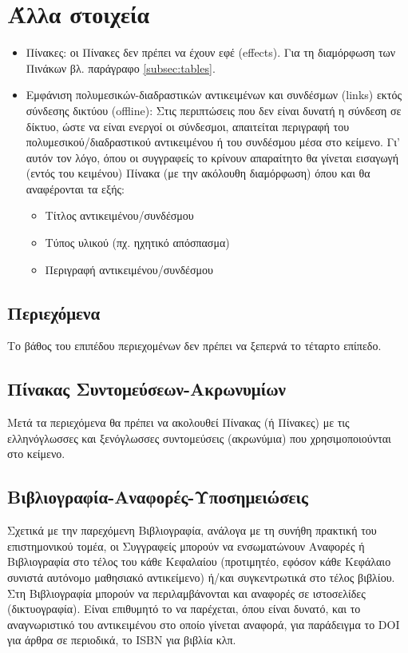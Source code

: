 \section{Άλλα στοιχεία}

\begin{itemize}
\item Πίνακες: οι Πίνακες δεν πρέπει να έχουν εφέ (effects). Για τη διαμόρφωση των Πινάκων
βλ. παράγραφο \ref{subsec:tables}.
\item Εμφάνιση πολυμεσικών-διαδραστικών αντικειμένων και συνδέσμων (links) εκτός
σύνδεσης δικτύου (offline): Στις περιπτώσεις που δεν είναι δυνατή η σύνδεση σε δίκτυο,
ώστε να είναι ενεργοί οι σύνδεσμοι, απαιτείται περιγραφή του πολυμεσικού/διαδραστικού
αντικειμένου ή του συνδέσμου μέσα στο κείμενο. Γι’ αυτόν τον λόγο, όπου οι συγγραφείς
το κρίνουν απαραίτητο θα γίνεται εισαγωγή (εντός του κειμένου) Πίνακα (με την ακόλουθη
διαμόρφωση) όπου και θα αναφέρονται τα εξής:
\begin{itemize}
\item Τίτλος αντικειμένου/συνδέσμου
\item Τύπος υλικού (πχ. ηχητικό απόσπασμα)
\item Περιγραφή αντικειμένου/συνδέσμου
\end{itemize}
\end{itemize}

\subsection{Περιεχόμενα}

Το βάθος του επιπέδου περιεχομένων δεν πρέπει να ξεπερνά το τέταρτο επίπεδο.

\subsection{Πίνακας Συντομεύσεων-Ακρωνυμίων}

Μετά τα περιεχόμενα θα πρέπει να ακολουθεί Πίνακας (ή Πίνακες) με τις
ελληνόγλωσσες και ξενόγλωσσες συντομεύσεις (ακρωνύμια) που χρησιμοποιούνται στο
κείμενο.

\subsection{Βιβλιογραφία-Αναφορές-Υποσημειώσεις}

Σχετικά με την παρεχόμενη Βιβλιογραφία, ανάλογα με τη συνήθη πρακτική του
επιστημονικού τομέα, οι Συγγραφείς μπορούν να ενσωματώνουν Αναφορές ή
Βιβλιογραφία στο τέλος του κάθε Κεφαλαίου (προτιμητέο, εφόσον κάθε Κεφάλαιο
συνιστά αυτόνομο μαθησιακό αντικείμενο) ή/και συγκεντρωτικά στο τέλος βιβλίου.
Στη Βιβλιογραφία μπορούν να περιλαμβάνονται και αναφορές σε ιστοσελίδες
(δικτυογραφία). Είναι επιθυμητό το να παρέχεται, όπου είναι δυνατό, και το αναγνωριστικό
του αντικειμένου στο οποίο γίνεται αναφορά, για παράδειγμα το DOI για άρθρα σε
περιοδικά, το ISBN για βιβλία κλπ.

